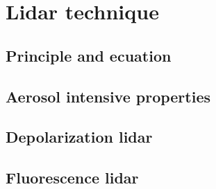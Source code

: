 \chapter{Lidar technique}
\label{sect::sota_chapter6}

\section{Principle and ecuation}

\section{Aerosol intensive properties}

\section{Depolarization lidar}

\section{Fluorescence lidar}

